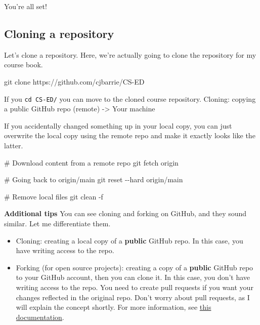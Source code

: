 \documentclass[
  letterpaper,
  DIV=11,
  numbers=noendperiod]{scrreprt}
\newenvironment{Shaded}{\begin{snugshade}}{\end{snugshade}}
\newcommand{\AttributeTok}[1]{\textcolor[rgb]{0.40,0.45,0.13}{#1}}
\newcommand{\CommentTok}[1]{\textcolor[rgb]{0.37,0.37,0.37}{#1}}
\newcommand{\FunctionTok}[1]{\textcolor[rgb]{0.28,0.35,0.67}{#1}}
\newcommand{\NormalTok}[1]{\textcolor[rgb]{0.00,0.23,0.31}{#1}}
\begin{document}
You're all set!

\hypertarget{cloning-a-repository}{%
\subsection*{Cloning a repository}\label{cloning-a-repository}}

Let's clone a repository. Here, we're actually going to clone the
repository for my course book.

\begin{Shaded}
\begin{Highlighting}[]
\FunctionTok{git}\NormalTok{ clone https://github.com/cjbarrie/CS{-}ED}
\end{Highlighting}
\end{Shaded}

If you \texttt{cd\ CS-ED/} you can move to the cloned course repository.
Cloning: copying a public GitHub repo (remote) -\textgreater{} Your
machine

If you accidentally changed something up in your local copy, you can
just overwrite the local copy using the remote repo and make it exactly
looks like the latter.

\begin{Shaded}
\begin{Highlighting}[]
\CommentTok{\# Download content from a remote repo }
\FunctionTok{git}\NormalTok{ fetch origin}

\CommentTok{\# Going back to origin/main}
\FunctionTok{git}\NormalTok{ reset }\AttributeTok{{-}{-}hard}\NormalTok{ origin/main }

\CommentTok{\# Remove local files }
\FunctionTok{git}\NormalTok{ clean }\AttributeTok{{-}f}
\end{Highlighting}
\end{Shaded}

\textbf{Additional tips} You can see cloning and forking on GitHub, and
they sound similar. Let me differentiate them.

\begin{itemize}
\item
  Cloning: creating a local copy of a \textbf{public} GitHub repo. In
  this case, you have writing access to the repo.
\item
  Forking (for open source projects): creating a copy of a
  \textbf{public} GitHub repo to your GitHub account, then you can clone
  it. In this case, you don't have writing access to the repo. You need
  to create pull requests if you want your changes reflected in the
  original repo. Don't worry about pull requests, as I will explain the
  concept shortly. For more information, see
  \href{https://docs.github.com/en/desktop/contributing-and-collaborating-using-github-desktop/cloning-and-forking-repositories-from-github-desktop}{this
  documentation}.
\end{itemize}
\end{document}
